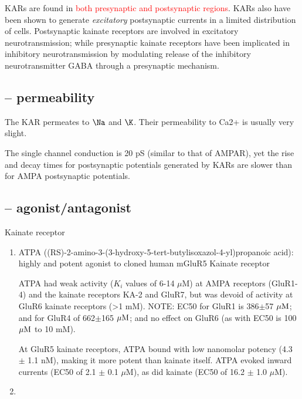 KARs are found in \textcolor{red}{both presynaptic and postsynaptic regions}.
KARs also have been shown to generate {\it excitatory} postsynaptic currents in
a limited distribution of cells. Postsynaptic kainate receptors are involved in
excitatory neurotransmission; while presynaptic kainate receptors have been
implicated in inhibitory neurotransmission by modulating release of the
inhibitory neurotransmitter GABA through a presynaptic mechanism.

\subsection{-- permeability}

The KAR permeates to $\Na$ and $\K$. Their permeability to Ca2+ is
usually very slight.

The single channel conduction is 20 pS (similar to that of AMPAR), yet 
the rise and decay times for postsynaptic potentials generated by KARs are
slower than for AMPA postsynaptic potentials.


\subsection{-- agonist/antagonist}

Kainate receptor
\begin{enumerate}
  \item ATPA ((RS)-2-amino-3-(3-hydroxy-5-tert-butylisoxazol-4-yl)propanoic
  acid): highly and potent agonist to cloned human mGluR5 Kainate receptor
  
ATPA had weak activity ($K_i$ values of 6-14 $\mu$M) at AMPA receptors (GluR1-4)
and the kainate receptors KA-2 and GluR7, but was devoid of activity at GluR6
kainate receptors (>1 mM). NOTE: EC50  for GluR1 is 386$\pm$57 ${\mu\text{M}}$; and for
GluR4 of 662$\pm$165 ${\mu\text{M}}$; and no effect on GluR6 (as with EC50 is 100 ${\mu\text{M}}$
to 10 mM).

At GluR5 kainate receptors, ATPA bound with low nanomolar potency (4.3 $\pm$ 1.1
nM), making it more potent than kainate itself.
ATPA evoked inward currents (EC50 of 2.1 $\pm$ 0.1 $\mu$M), as did kainate
(EC50 of 16.2 $\pm$ 1.0 $\mu$M).


  \item 

\end{enumerate}


